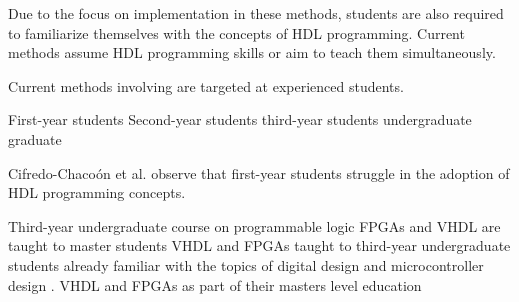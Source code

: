 \documentclass[openright]{template/uva-bachelor-thesis}
\begin{document}




Due to the focus on implementation in these methods, students are also required to familiarize themselves with the concepts of HDL programming. Current methods assume HDL programming skills \cite{jansen2014every} or aim to teach them simultaneously. 


Current methods involving are targeted at experienced students.  

First-year students \cite{cifredo2015computer}
Second-year students \cite{lee2012pipelined}
third-year students\cite{kellett2012project}
undergraduate \cite{}
graduate \cite{nakano2008processor} \cite{jansen2014every} 


Cifredo-Chaco\'on et al.  \cite{cifredo2015computer} observe that first-year students struggle in the adoption of HDL programming concepts. 

Third-year undergraduate course on programmable logic \cite{kellett2012project}
FPGAs and VHDL are taught to master students \cite{pereira2012basic}
VHDL and FPGAs taught to third-year undergraduate students already familiar with the topics of digital design and microcontroller design \cite{kellett2012project}. VHDL and FPGAs as part of their masters level education \cite{jansen2014every, pereira2012basic}
\end{document}
